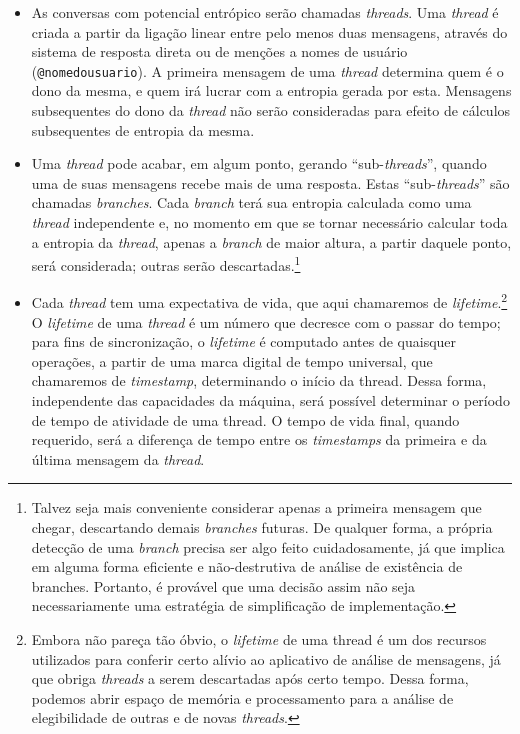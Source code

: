 \documentclass[conference]{IEEEtran}
\begin{document}
\begin{itemize}
\item As conversas com potencial entrópico serão chamadas \textit{threads}. Uma \textit{thread} é criada a partir da ligação linear entre pelo menos duas mensagens, através do sistema de resposta direta ou de menções a nomes de usuário (\texttt{@nomedousuario}). A primeira mensagem de uma \textit{thread} determina quem é o dono da mesma, e quem irá lucrar com a entropia gerada por esta. Mensagens subsequentes do dono da \textit{thread} não serão consideradas para efeito de cálculos subsequentes de entropia da mesma.
\item Uma \textit{thread} pode acabar, em algum ponto, gerando ``sub-\textit{threads}'', quando uma de suas mensagens recebe mais de uma resposta. Estas ``sub-\textit{threads}'' são chamadas \textit{branches}. Cada \textit{branch} terá sua entropia calculada como uma \textit{thread} independente e, no momento em que se tornar necessário calcular toda a entropia da \textit{thread}, apenas a \textit{branch} de maior altura, a partir daquele ponto, será considerada; outras serão descartadas.\footnote{Talvez seja mais conveniente considerar apenas a primeira mensagem que chegar, descartando demais \textit{branches} futuras. De qualquer forma, a própria detecção de uma \textit{branch} precisa ser algo feito cuidadosamente, já que implica em alguma forma eficiente e não-destrutiva de análise de existência de branches. Portanto, é provável que uma decisão assim não seja necessariamente uma estratégia de simplificação de implementação.}
\item Cada \textit{thread} tem uma expectativa de vida, que aqui chamaremos de \textit{lifetime}.\footnote{Embora não pareça tão óbvio, o \textit{lifetime} de uma thread é um dos recursos utilizados para conferir certo alívio ao aplicativo de análise de mensagens, já que obriga \textit{threads} a serem descartadas após certo tempo. Dessa forma, podemos abrir espaço de memória e processamento para a análise de elegibilidade de outras e de novas \textit{threads}.} O \textit{lifetime} de uma \textit{thread} é um número que decresce com o passar do tempo; para fins de sincronização, o \textit{lifetime} é computado antes de quaisquer operações, a partir de uma marca digital de tempo universal, que chamaremos de \textit{timestamp}, determinando o início da thread. Dessa forma, independente das capacidades da máquina, será possível determinar o período de tempo de atividade de uma thread. O tempo de vida final, quando requerido, será a diferença de tempo entre os \textit{timestamps} da primeira e da última mensagem da \textit{thread}.

\end{itemize}
\end{document}
